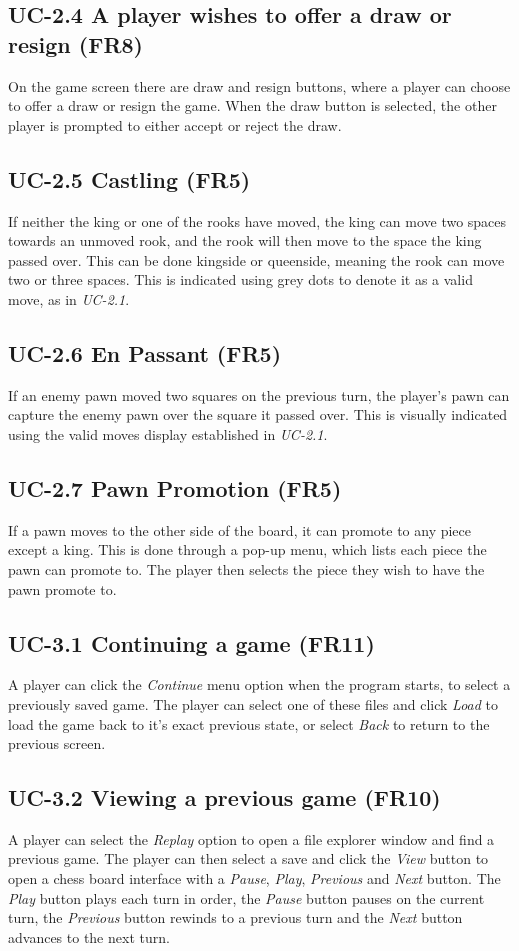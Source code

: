 \documentclass{project}
\begin{document}
\subsection{UC-2.4 A player wishes to offer a draw or resign (FR8)}
On the game screen there are draw and resign buttons, where a player can choose to offer a draw or resign the game. When the draw button is selected, the other player is prompted to either accept or reject the draw.
\subsection{UC-2.5 Castling (FR5)}
If neither the king or one of the rooks have moved, the king can move two spaces towards an unmoved rook, and the rook will then move to the space the king passed over. This can be done kingside or queenside, meaning the rook can move two or three spaces. This is indicated using grey dots to denote it as a valid move, as in \emph{UC-2.1}.
\subsection{UC-2.6 En Passant (FR5)}
If an enemy pawn moved two squares on the previous turn, the player's pawn can capture the enemy pawn over the square it passed over. This is visually indicated using the valid moves display established in \emph{UC-2.1}.
\subsection{UC-2.7 Pawn Promotion (FR5)}
If a pawn moves to the other side of the board, it can promote to any piece except a king. This is done through a pop-up menu, which lists each piece the pawn can promote to. The player then selects the piece they wish to have the pawn promote to.
\subsection{UC-3.1 Continuing a game (FR11)}
A player can click the \emph{Continue} menu option when the program starts, to select a previously saved game. The player can select one of these files and click \emph{Load} to load the game back to it's exact previous state, or select \emph{Back} to return to the previous screen.
\subsection{UC-3.2 Viewing a previous game (FR10)}
A player can select the \emph{Replay} option to open a file explorer window and find a previous game. The player can then select a save and click the \emph{View} button to open a chess board interface with a \emph{Pause}, \emph{Play}, \emph{Previous} and \emph{Next} button. The \emph{Play} button plays each turn in order, the \emph{Pause} button pauses on the current turn, the \emph{Previous} button rewinds to a previous turn and the \emph{Next} button advances to the next turn.
\end{document}
